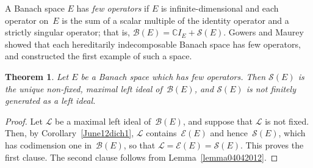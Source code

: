\documentclass[12pt]{amsart}
\newtheorem{theorem}{Theorem}[section]
\theoremstyle{definition}
\numberwithin{equation}{section}
\begin{document}
A Banach space $E$ has \emph{few operators} if $E$ is
infinite-dimensional and each operator on~$E$ is the sum of a scalar
multiple of the identity operator and a strictly singular operator;
that is, $\mathscr{B}(E) = \mathbb{C}I_E + \mathscr{S}(E)$. Gowers and
Maurey~\cite{gm} showed that each hereditarily in\-de\-composable
Banach space has few operators, and constructed the first example of
such a space.

\begin{theorem}\label{fewopsimpliesfixed}
  Let $E$ be a Banach space which has few operators.  Then
  $\mathscr{S}(E)$ is the unique non-fixed, maximal left ideal
  of~$\mathscr{B}(E)$, and $\mathscr{S}(E)$ is not finitely generated
  as a left ideal.
\end{theorem}

\begin{proof} Let $\mathscr{L}$ be a maximal left ideal
  of~$\mathscr{B}(E)$, and suppose that $\mathscr{L}$ is not fixed.
  Then, by Corollary~\ref{June12dich1}, $\mathscr{L}$
  contains~$\mathscr{E}(E)$ and hence~$\mathscr{S}(E)$, which has
  codimension one in~$\mathscr{B}(E)$, so that $\mathscr{L} =
  \mathscr{E}(E) = \mathscr{S}(E)$. This proves the first clause. The
  second clause follows from Lemma~\ref{lemma04042012}.
\end{proof}
\end{document}
